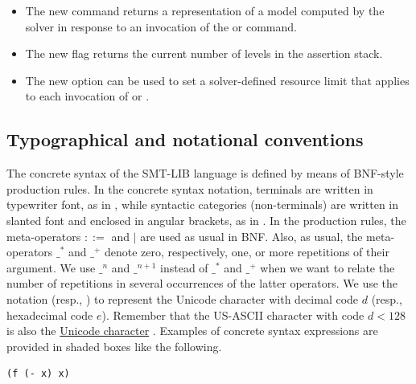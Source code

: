 \begin{itemize}
\item
The new command  returns a representation of a model computed
by the solver in response to an invocation of the  or 
 command.

\item
The new  flag  returns 
the current number of levels in the assertion stack.

\item
The new option  can be used to set 
a solver-defined resource limit that applies to each invocation of 
 or .

\end{itemize}





\subsection{Typographical and notational conventions}

The concrete syntax of the SMT-LIB language is defined
by means of BNF-style production rules.
In the concrete syntax notation,
terminals are written in typewriter font, as in ,
while syntactic categories (non-terminals) are written 
in slanted font and enclosed in angular brackets, as in .
In the production rules, the meta-operators $::=$ and $\mid$ are used as usual 
in BNF. 
Also, as usual, the meta-operators $\_^*$ and $\_^+$ denote zero, respectively, 
one, or more repetitions of their argument.
We use $\_^n$ and $\_^{n+1}$ instead of $\_^*$ and $\_^+$ 
when we want to relate the number of repetitions in several occurrences of the latter operators.
We use the notation  (resp., ) to represent 
the Unicode character with decimal code $d$ (resp., hexadecimal code $e$).  Remember that the US-ASCII character with code $d < 128$ is also 
the \href{http://www.utf8-chartable.de/unicode-utf8-table.pl?utf8=dec}{Unicode character} .
Examples of concrete syntax expressions are provided in shaded boxes like the following.
\begin{lstlisting}[linewidth=10em]
(f (- x) x) 
\end{lstlisting}
 
